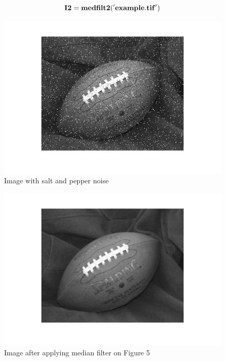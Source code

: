 \documentclass[12pt]{article}
\begin{document}
      \[{\bf I2 = medfilt2('example.tif')}\]
      \begin{figure}
       \centering
      \includegraphics[scale=0.5]{impure.jpg}
      \caption{Image with salt and pepper noise}
      \end{figure}
       \clearpage
       \begin{figure}
       \centering
      \includegraphics[scale=0.5]{footballmedfil.jpg}
      \caption{Image after applying median filter on Figure 5}
      \end{figure}
       
\end{document}
